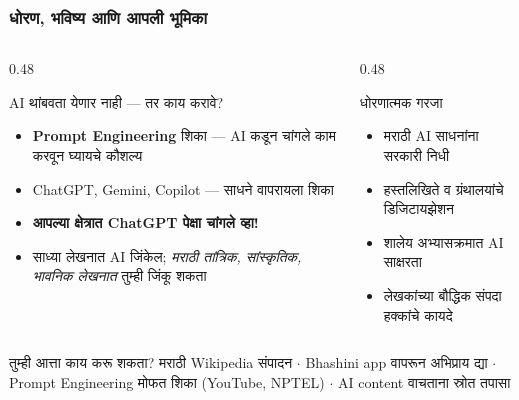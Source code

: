 \begin{frame}[fragile]\frametitle{धोरण, भविष्य आणि आपली भूमिका}

\begin{columns}[T]
\begin{column}{0.48\textwidth}
\begin{block}{AI थांबवता येणार नाही — तर काय करावे?}
\begin{itemize}
\item \textbf{Prompt Engineering} शिका — AI कडून चांगले काम करवून घ्यायचे कौशल्य
\item ChatGPT, Gemini, Copilot — साधने वापरायला शिका
\item \textbf{आपल्या क्षेत्रात ChatGPT पेक्षा चांगले व्हा!}
\item साध्या लेखनात AI जिंकेल; \textit{मराठी तांत्रिक, सांस्कृतिक, भावनिक लेखनात} तुम्ही जिंकू शकता
\end{itemize}
\end{block}
\end{column}
\begin{column}{0.48\textwidth}
\begin{block}{धोरणात्मक गरजा}
\begin{itemize}
\item मराठी AI साधनांना सरकारी निधी
\item हस्तलिखिते व ग्रंथालयांचे डिजिटायझेशन
\item शालेय अभ्यासक्रमात AI साक्षरता
\item लेखकांच्या बौद्धिक संपदा हक्कांचे कायदे
\end{itemize}
\end{block}
\end{column}
\end{columns}

\vspace{0.2cm}
\begin{exampleblock}{तुम्ही आत्ता काय करू शकता?}
मराठी Wikipedia संपादन $\cdot$ Bhashini app वापरून अभिप्राय द्या $\cdot$
Prompt Engineering मोफत शिका (YouTube, NPTEL) $\cdot$ AI content वाचताना स्रोत तपासा
\end{exampleblock}


\end{frame}

